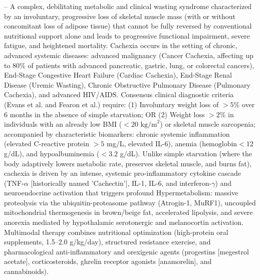 -- A complex, debilitating metabolic and clinical wasting syndrome characterized by an involuntary, progressive loss of skeletal muscle mass (with or without concomitant loss of adipose tissue) that cannot be fully reversed by conventional nutritional support alone and leads to progressive functional impairment, severe fatigue, and heightened mortality. Cachexia occurs in the setting of chronic, advanced systemic diseases: advanced malignancy (Cancer Cachexia, affecting up to 80\% of patients with advanced pancreatic, gastric, lung, or colorectal cancers), End-Stage Congestive Heart Failure (Cardiac Cachexia), End-Stage Renal Disease (Uremic Wasting), Chronic Obstructive Pulmonary Disease (Pulmonary Cachexia), and advanced HIV/AIDS. Consensus clinical diagnostic criteria (Evans et al. and Fearon et al.) require: (1) Involuntary weight loss of $>5\%$ over 6 months in the absence of simple starvation; OR (2) Weight loss $>2\%$ in individuals with an already low BMI ($<20\text{ kg/m}^2$) or skeletal muscle sarcopenia; accompanied by characteristic biomarkers: chronic systemic inflammation (elevated C-reactive protein $>5$ mg/L, elevated IL-6), anemia ($\text{hemoglobin} < 12$ g/dL), and hypoalbuminemia ($<3.2$ g/dL). Unlike simple starvation (where the body adaptively lowers metabolic rate, preserves skeletal muscle, and burns fat), cachexia is driven by an intense, systemic pro-inflammatory cytokine cascade (TNF-$\alpha$ [historically named 'Cachectin'], IL-1, IL-6, and interferon-$\gamma$) and neuroendocrine activation that triggers profound Hypermetabolism: massive proteolysis via the ubiquitin-proteasome pathway (Atrogin-1, MuRF1), uncoupled mitochondrial thermogenesis in brown/beige fat, accelerated lipolysis, and severe anorexia mediated by hypothalamic serotonergic and melanocortin activation. Multimodal therapy combines nutritional optimization (high-protein oral supplements, 1.5--2.0 g/kg/day), structured resistance exercise, and pharmacological anti-inflammatory and orexigenic agents (progestins [megestrol acetate], corticosteroids, ghrelin receptor agonists [anamorelin], and cannabinoids).

